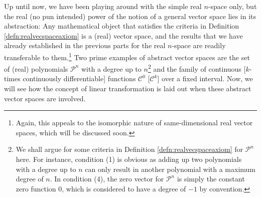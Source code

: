 Up until now, we have been playing around with the simple real $n$-space only, but the real (no pun intended) power of the notion of a general vector space lies in its abstraction: Any mathematical object that satisfies the criteria in Definition \ref{defn:realvecspaceaxiom} is a (real) vector space, and the results that we have already established in the previous parts for the real $n$-space are readily transferable to them.\footnote{Again, this appeals to the isomorphic nature of same-dimensional real vector spaces, which will be discussed soon.} Two prime examples of abstract vector spaces are the set of (real) polynomials $\mathcal{P}^n$ with a degree up to $n$\footnote{We shall argue for some criteria in Definition \ref{defn:realvecspaceaxiom} for $\mathcal{P}^n$ here. For instance, condition (1) is obvious as adding up two polynomials with a degree up to $n$ can only result in another polynomial with a maximum degree of $n$. In condition (4), the zero vector for $\mathcal{P}^n$ is simply the constant zero function $0$, which is considered to have a degree of $-1$ by convention.} and the family of continuous [$k$-times continuously differentiable] functions $\mathcal{C}^0$ [$\mathcal{C}^k$] over a fixed interval. Now, we will see how the concept of linear transformation is laid out when these abstract vector spaces are involved.

